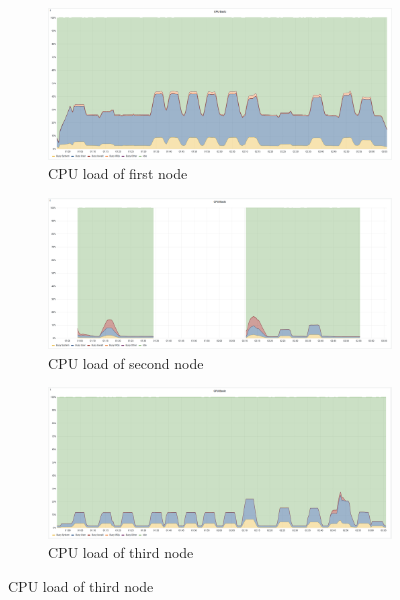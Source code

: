 \begin{figure}[H]
    \begin{subfigure}[h]{0.5\linewidth}
        \centering
        \includegraphics[width=1\linewidth]{other-fig/tests/burst_cpu1.png}
        \caption{CPU load of first node}
    \end{subfigure}
    \hfill
    \begin{subfigure}[h]{0.5\linewidth}
        \centering
        \includegraphics[width=1\linewidth]{other-fig/tests/burst_cpu2.png}
        \caption{CPU load of second node}
    \end{subfigure}
    \begin{subfigure}[h]{0.5\linewidth}
        \centering
        \includegraphics[width=1\linewidth]{other-fig/tests/burst_cpu3.png}
        \caption{CPU load of third node}
    \end{subfigure}

\end{figure}
